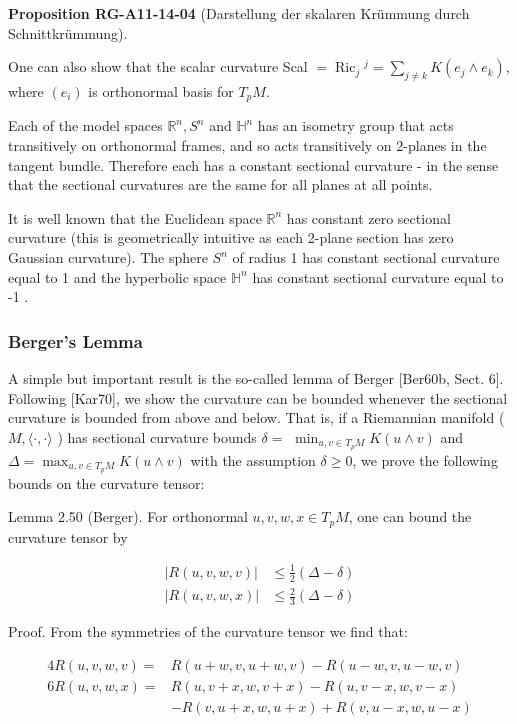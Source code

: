\documentclass[10pt, letterpaper]{article}
\newcommand{\CustomHeading}[3]{%
  \par\medskip\noindent%
  \textbf{#1 #2} \textnormal{(#3)}.\enskip%
}
\newenvironment{PROP}[2]{\begin{unitbox}\CustomHeading{Proposition}{#1}{#2}}{\end{unitbox}}
\begin{document}
\begin{PROP}{RG-A11-14-04}{Darstellung der skalaren Krümmung durch Schnittkrümmung}
One can also show that the scalar curvature Scal $=\operatorname{Ric}_{j}{ }^{j}=\sum_{j \neq k} K\left(e_{j} \wedge e_{k}\right)$, where $\left(e_{i}\right)$ is orthonormal basis for $T_{p} M$.
\end{PROP}

Each of the model spaces $\mathbb{R}^{n}, S^{n}$ and $\mathbb{H}^{n}$ has an isometry group that acts transitively on orthonormal frames, and so acts transitively on 2-planes in the tangent bundle. Therefore each has a constant sectional curvature - in the sense that the sectional curvatures are the same for all planes at all points.

It is well known that the Euclidean space $\mathbb{R}^{n}$ has constant zero sectional curvature (this is geometrically intuitive as each 2-plane section has zero Gaussian curvature). The sphere $S^{n}$ of radius 1 has constant sectional curvature equal to 1 and the hyperbolic space $\mathbb{H}^{n}$ has constant sectional curvature equal to -1 .

\subsubsection*{Berger's Lemma}


A simple but important result is the so-called lemma of Berger [Ber60b, Sect. 6]. Following [Kar70], we show the curvature can be bounded whenever the sectional curvature is bounded from above and below. That is, if a Riemannian manifold ( $M,\langle\cdot, \cdot\rangle$ ) has sectional curvature bounds $\delta=$ $\min _{u, v \in T_{p} M} K(u \wedge v)$ and $\Delta=\max _{u, v \in T_{p} M} K(u \wedge v)$ with the assumption $\delta \geq 0$, we prove the following bounds on the curvature tensor:

Lemma 2.50 (Berger). For orthonormal $u, v, w, x \in T_{p} M$, one can bound the curvature tensor by

$$
\begin{aligned}
|R(u, v, w, v)| & \leq \frac{1}{2}(\Delta-\delta) \\
|R(u, v, w, x)| & \leq \frac{2}{3}(\Delta-\delta)
\end{aligned}
$$

Proof. From the symmetries of the curvature tensor we find that:

$$
\begin{aligned}
4 R(u, v, w, v)= & R(u+w, v, u+w, v)-R(u-w, v, u-w, v) \\
6 R(u, v, w, x)= & R(u, v+x, w, v+x)-R(u, v-x, w, v-x) \\
& -R(v, u+x, w, u+x)+R(v, u-x, w, u-x)
\end{aligned}
$$
\end{document}
